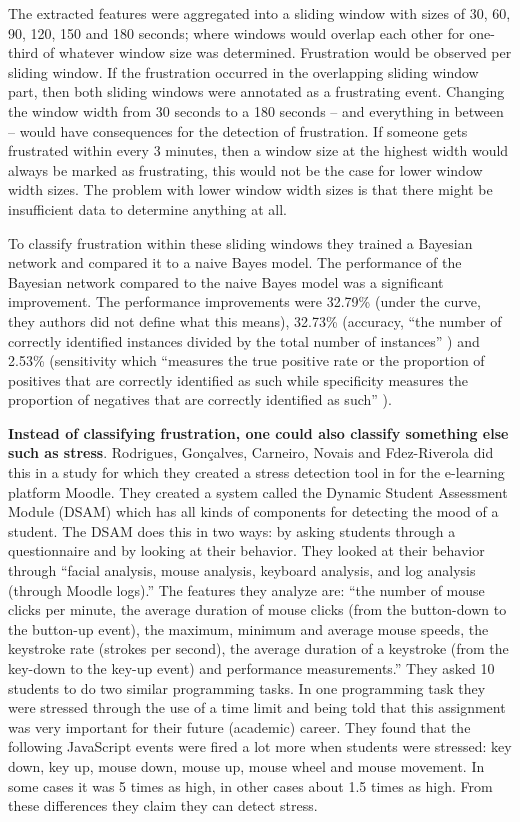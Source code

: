 The extracted features were aggregated into a sliding window with sizes of 30, 60, 90, 120, 150 and 180 seconds; where windows would overlap each other for one-third of whatever window size was determined. Frustration would be observed per sliding window. If the frustration occurred in the overlapping sliding window part, then both sliding windows were annotated as a frustrating event. Changing the window width from 30 seconds to a 180 seconds -- and everything in between -- would have consequences for the detection of frustration. If someone gets frustrated within every 3 minutes, then a window size at the highest width would always be marked as frustrating, this would not be the case for lower window width sizes. The problem with lower window width sizes is that there might be insufficient data to determine anything at all.

To classify frustration within these sliding windows they trained a Bayesian network and compared it to a naive Bayes model. The performance of the Bayesian network compared to the naive Bayes model was a significant improvement. The performance improvements were 32.79\% (under the curve, they authors did not define what this means), 32.73\% (accuracy, ``the number of correctly identified instances divided by the total number of instances'' \cite{leong2016}) and 2.53\% (sensitivity which ``measures the true positive rate or the proportion of positives that are correctly identified as such while specificity measures the proportion of negatives that are correctly identified as such'' \cite{leong2016}).

\textbf{Instead of classifying frustration, one could also classify something else such as stress}. Rodrigues, Gon{\c{c}}alves, Carneiro, Novais and Fdez-Riverola did this \cite{rodrigues2013} in a study for which they created a stress detection tool in for the e-learning platform Moodle. They created a system called the Dynamic Student Assessment Module (DSAM) which has all kinds of components for detecting the mood of a student. The DSAM does this in two ways: by asking students through a questionnaire and by looking at their behavior. They looked at their behavior through ``facial analysis, mouse analysis, keyboard analysis, and log analysis (through Moodle logs).\cite{rodrigues2013}'' The features they analyze are: ``the number of mouse clicks per minute, the average duration of mouse clicks (from the button-down to the button-up event), the maximum, minimum and average mouse speeds, the keystroke rate (strokes per second), the average duration of a keystroke (from the key-down to the key-up event) and performance measurements.\cite{rodrigues2013}'' They asked 10 students to do two similar programming tasks. In one programming task they were stressed through the use of a time limit and being told that this assignment was very important for their future (academic) career.   They found that the following JavaScript events were fired a lot more when students were stressed: key down, key up, mouse down, mouse up, mouse wheel and mouse movement. In some cases it was 5 times as high, in other cases about 1.5 times as high. From these differences they claim they can detect stress.

